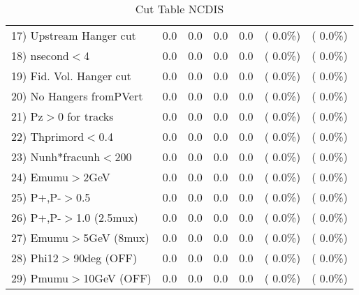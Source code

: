 \begin{table}[h!]
\begin{tabular}{||l||r|r|r|r|r|r||}
 17) Upstream Hanger cut  &          0.0 &          0.0 &          0.0 &          0.0 & (  0.0\%) & (  0.0\%) \\
 18) nsecond$<$4          &          0.0 &          0.0 &          0.0 &          0.0 & (  0.0\%) & (  0.0\%) \\
 19) Fid. Vol. Hanger cut &          0.0 &          0.0 &          0.0 &          0.0 & (  0.0\%) & (  0.0\%) \\
 20) No Hangers fromPVert &          0.0 &          0.0 &          0.0 &          0.0 & (  0.0\%) & (  0.0\%) \\
 21) Pz$>$0 for tracks    &          0.0 &          0.0 &          0.0 &          0.0 & (  0.0\%) & (  0.0\%) \\
 22) Thprimord$<$0.4      &          0.0 &          0.0 &          0.0 &          0.0 & (  0.0\%) & (  0.0\%) \\
 23) Nunh*fracunh$<$200   &          0.0 &          0.0 &          0.0 &          0.0 & (  0.0\%) & (  0.0\%) \\
 24) Emumu$>$2GeV         &          0.0 &          0.0 &          0.0 &          0.0 & (  0.0\%) & (  0.0\%) \\
 25) P+,P-$>$0.5          &          0.0 &          0.0 &          0.0 &          0.0 & (  0.0\%) & (  0.0\%) \\
 26) P+,P-$>$1.0 (2.5mux) &          0.0 &          0.0 &          0.0 &          0.0 & (  0.0\%) & (  0.0\%) \\
 27) Emumu$>$5GeV  (8mux) &          0.0 &          0.0 &          0.0 &          0.0 & (  0.0\%) & (  0.0\%) \\
 28) Phi12$>$90deg  (OFF) &          0.0 &          0.0 &          0.0 &          0.0 & (  0.0\%) & (  0.0\%) \\
 29) Pmumu$>$10GeV  (OFF) &          0.0 &          0.0 &          0.0 &          0.0 & (  0.0\%) & (  0.0\%) \\
 \hline
 \hline
 \end{tabular}
 \caption{Cut Table  NCDIS    }
 \label{tab-cutcohjpsi-mumu_ncdis}
 \end{table}

